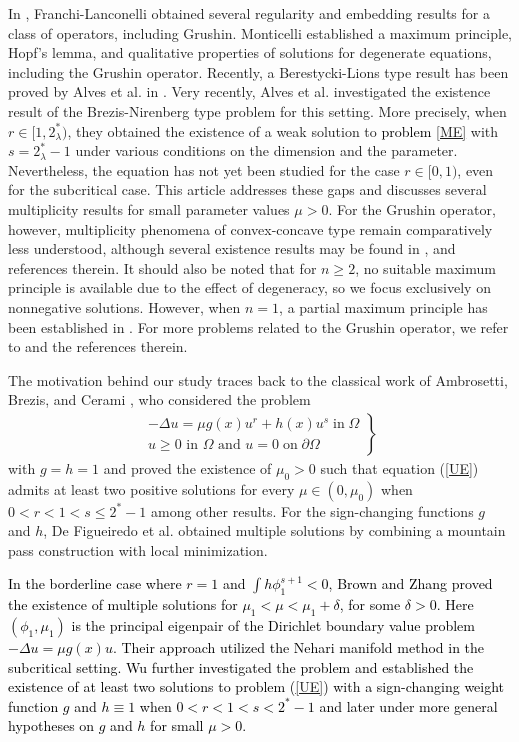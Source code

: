 \documentclass[12pt, notitlepage]{article}
\begin{document}
{In \cite{FL}, Franchi-Lanconelli obtained several regularity and embedding results for a class of operators, including Grushin. Monticelli \cite{Monti} established a maximum principle, Hopf's lemma, and qualitative properties of solutions for degenerate equations, including the Grushin operator. Recently, a Berestycki-Lions type result has been proved by Alves et al. in \cite{Alves23}. Very recently, Alves et al. \cite{PL} investigated the existence result of the Brezis-Nirenberg type problem for this setting. More precisely, when $r\in[1,2^*_\lambda)$, they obtained the existence of a weak solution to \textcolor{black}{problem \eqref{ME}} with $s=2^*_\lambda-1$ under various conditions on the dimension and the parameter. Nevertheless, the equation has not yet been studied for the case $r\in[0,1)$, even for the subcritical case. This article addresses these gaps and discusses several multiplicity results for small parameter values $\mu>0$. For the Grushin operator, however, multiplicity phenomena of convex-concave type remain comparatively less understood, although several existence results may be found in \cite{KS, KOG}, and references therein. It should also be noted that for $n\geq 2$, no suitable maximum principle is available due to the effect of degeneracy, so we focus exclusively on nonnegative solutions. However, when $n=1$, a partial maximum principle has been established in \cite{KS}. For more problems related to the Grushin operator, we refer to \cite{WB01, Ambrosio04, Duong17, Duong, RM} and the references therein.

The motivation behind our study traces back to the classical work of  Ambrosetti, Brezis, and Cerami \cite{BR}, who considered the problem
\begin{align}\label{UE}
    \left. \begin{array}{l}
        -\Delta u=\mu g(x)u^r+h(x)u^s\; \text{in}\;\Omega\\
             u\geq 0\text{ in }\Omega \text{ and } u=0\;\text{on}\;\partial\Omega
    \end{array}\right\} 
\end{align}
with $g=h=1$ and proved the existence of $\mu_0>0$ such that equation (\ref{UE}) admits at least two positive solutions for every $\mu\in(0,\mu_0)$ when $0<r<1<s\leq 2^*-1$ among other results. For the sign-changing functions $g$ and $h$, De Figueiredo et al. \cite{DE} obtained multiple solutions by combining a mountain pass construction with local minimization.

\textcolor{black}{In the borderline case where $r=1$ and $\int h\phi_1^{s+1}<0$, Brown and Zhang \cite{BZ} proved the existence of multiple solutions for $\mu_1<\mu<\mu_1+\delta$, for some $\delta>0$. Here $(\phi_1,\mu_1)$ is the principal eigenpair of the Dirichlet boundary value problem $-\Delta u=\mu g(x)u$. Their approach utilized the Nehari manifold method in the subcritical setting. Wu \cite{WU1, WU} further investigated the problem and established the existence of at least two solutions to problem (\ref{UE}) with a sign-changing weight function $g$ and $h\equiv 1$ when $0<r<1<s<2^*-1$ and later under more general hypotheses on $g$ and $h$ for small $\mu>0.$}

}
\end{document}
